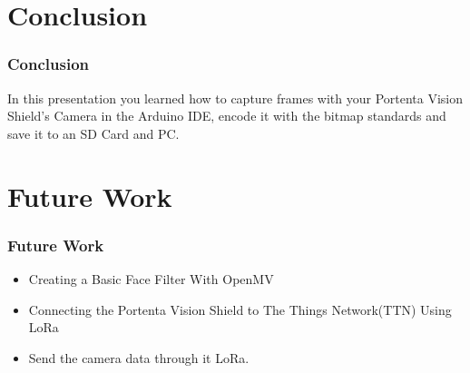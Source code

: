 \documentclass[10pt, a4paper]{beamer}
\begin{document}
	\section{Conclusion}
	\begin{frame}
		\frametitle{Conclusion}
		In this presentation you learned how to capture frames with your Portenta Vision Shield's Camera in the Arduino IDE, encode it with the bitmap standards and save it to an SD Card and PC.
		
	\end{frame}
	
	\section{Future Work}
	\begin{frame}
		\frametitle{Future Work}
		\begin{itemize}
			\item Creating a Basic Face Filter With OpenMV
			\item Connecting the Portenta Vision Shield to The Things Network(TTN) Using LoRa 
			\item Send the camera data through it LoRa.
		\end{itemize}
	\end{frame}
	
	
	
\end{document}
